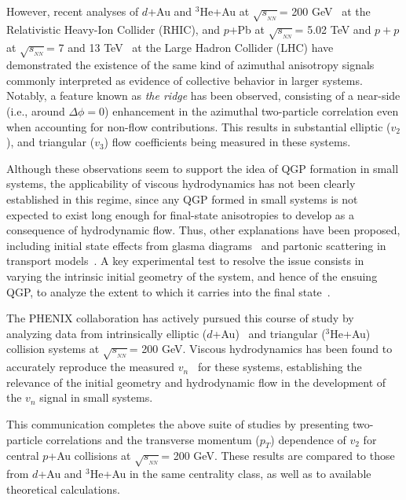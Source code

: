 \documentclass[%
reprint,
showpacs,preprintnumbers,
 amsmath,amssymb,
 aps,
]{revtex4-1}
\newcommand{\pt}{\mbox{$p_T$}\xspace}
\newcommand{\sqsn}{\mbox{$\sqrt{s_{_{NN}}}$}\xspace}
\newcommand{\dau}{\mbox{$d$+Au}\xspace}
\newcommand{\pau}{\mbox{$p$+Au}\xspace}
\newcommand{\hau}{\mbox{$^3\text{He}$+Au}\xspace}
\newcommand{\ppb}{\mbox{$p$+Pb}\xspace}
\begin{document}
However, recent analyses of \dau and \hau at \sqsn = 200 GeV~\cite{adare_measurement_2014,Adamczyk:2014fcx,PhysRevLett.115.142301} at the Relativistic Heavy-Ion Collider (RHIC), and \ppb at \sqsn = 5.02 TeV and $p+p$ at \sqsn = 7 and 13 TeV~\cite{alice_long_2013,atlas_observation_2012,cms_observation_2012,Khachatryan:2015lva,Aad:2015gqa} at the Large Hadron Collider (LHC) have demonstrated the existence of the same kind of azimuthal anisotropy signals commonly interpreted as evidence of collective behavior in larger systems. Notably, a feature known as \textit{the ridge} has been observed, consisting of a near-side (i.e., around $\Delta \phi = 0$) enhancement in the azimuthal two-particle correlation even when accounting for non-flow contributions. This results in substantial elliptic ($v_2$), and triangular ($v_3$) flow coefficients being measured in these systems.

Although these observations seem to support the idea of QGP formation in small systems, the applicability of viscous hydrodynamics has not been clearly established in this regime, since any QGP formed in small systems is not expected to exist long enough for final-state anisotropies to develop as a consequence of hydrodynamic flow. Thus, other explanations have been proposed, including initial state effects from glasma diagrams~\cite{dusling_azimuthal_2012} and partonic scattering in transport models~\cite{bzdak_elliptic_2014,ma_long-range_2014,Koop:2015wea}. A key experimental test to resolve the issue consists in varying the intrinsic initial geometry of the system, and hence of the ensuing QGP, to analyze the extent to which it carries into the final state~\cite{nagle_exploiting_2013}. 

The PHENIX collaboration has actively pursued this course of study by analyzing data from intrinsically elliptic (\dau)~\cite{adare_measurement_2014,PhysRevLett.111.212301} and triangular (\hau)~\cite{Adare:2015ctn} collision systems at \sqsn = 200 GeV. Viscous hydrodynamics has been found to accurately reproduce the measured $v_n$~\cite{Romatschke:2015gxa} for these systems, establishing the relevance of the initial geometry and hydrodynamic flow in the development of the $v_n$ signal in small systems.

This communication completes the above suite of studies by presenting two-particle correlations and the transverse momentum (\pt) dependence of $v_2$ for central \pau collisions at \sqsn = 200 GeV. These results are compared to those from \dau and \hau in the same centrality class, as well as to available theoretical calculations.
\end{document}
